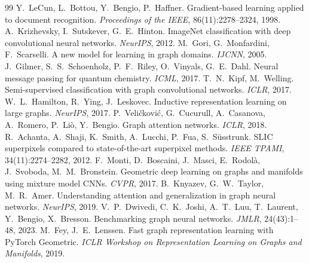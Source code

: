 \documentclass[11pt,a4paper]{article}
\begin{document}
\begin{thebibliography}{99}\small
{} Y.~LeCun, L.~Bottou, Y.~Bengio, P.~Haffner. Gradient-based learning applied to document recognition. \emph{Proceedings of the IEEE}, 86(11):2278--2324, 1998.
 A.~Krizhevsky, I.~Sutskever, G.~E.~Hinton. ImageNet classification with deep convolutional neural networks. \emph{NeurIPS}, 2012.
 M.~Gori, G.~Monfardini, F.~Scarselli. A new model for learning in graph domains. \emph{IJCNN}, 2005.
 J.~Gilmer, S.~S.~Schoenholz, P.~F.~Riley, O.~Vinyals, G.~E.~Dahl. Neural message passing for quantum chemistry. \emph{ICML}, 2017.
 T.~N.~Kipf, M.~Welling. Semi-supervised classification with graph convolutional networks. \emph{ICLR}, 2017.
 W.~L.~Hamilton, R.~Ying, J.~Leskovec. Inductive representation learning on large graphs. \emph{NeurIPS}, 2017.
 P.~Veličković, G.~Cucurull, A.~Casanova, A.~Romero, P.~Liò, Y.~Bengio. Graph attention networks. \emph{ICLR}, 2018.
 R.~Achanta, A.~Shaji, K.~Smith, A.~Lucchi, P.~Fua, S.~Süsstrunk. SLIC superpixels compared to state-of-the-art superpixel methods. \emph{IEEE TPAMI}, 34(11):2274--2282, 2012.
 F.~Monti, D.~Boscaini, J.~Masci, E.~Rodolà, J.~Svoboda, M.~M.~Bronstein. Geometric deep learning on graphs and manifolds using mixture model CNNs. \emph{CVPR}, 2017.
 B.~Knyazev, G.~W.~Taylor, M.~R.~Amer. Understanding attention and generalization in graph neural networks. \emph{NeurIPS}, 2019.
 V.~P.~Dwivedi, C.~K.~Joshi, A.~T.~Luu, T.~Laurent, Y.~Bengio, X.~Bresson. Benchmarking graph neural networks. \emph{JMLR}, 24(43):1--48, 2023.
 M.~Fey, J.~E.~Lenssen. Fast graph representation learning with PyTorch Geometric. \emph{ICLR Workshop on Representation Learning on Graphs and Manifolds}, 2019.
\end{thebibliography}
\end{document}
